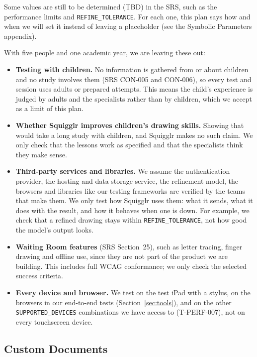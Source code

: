 \documentclass[12pt, titlepage]{article}
\begin{document}
Some values are still to be determined (TBD) in the SRS, such as the performance limits and
\texttt{REFINE\_TOLERANCE}. For each one, this plan says how and when we will
set it instead of leaving a placeholder (see the Symbolic Parameters
appendix).

With five people and one academic year, we are leaving these out:

\begin{itemize}
  \item \textbf{Testing with children.} No information is gathered from or
    about children and no study involves them (SRS CON-005 and CON-006), so every test and session uses adults or
    prepared attempts. This means the child's experience is judged by adults
    and the specialists rather than by children, which we accept as a limit
    of this plan.
  \item \textbf{Whether Squigglr improves children's drawing skills.} Showing
    that would take a long study with children, and Squigglr makes no such
    claim. We only check that the lessons work as specified and that the
    specialists think they make sense.
  \item \textbf{Third-party services and libraries.} We assume the
    authentication provider, the hosting and data storage service, the
    refinement model, the browsers and libraries like our testing frameworks
    are verified by the teams that make them. We only test how Squigglr uses
    them: what it sends, what it does with the result, and how it behaves when
    one is down. For example, we check that a refined drawing stays within
    \texttt{REFINE\_TOLERANCE}, not how good the model's output looks.
  \item \textbf{Waiting Room features} (SRS Section~25), such as letter
    tracing, finger drawing and offline use, since they are not part of the
    product we are building. This includes full WCAG conformance; we only
    check the selected success criteria.
  \item \textbf{Every device and browser.} We test on the test iPad with a
    stylus, on the browsers in our end-to-end tests (Section~\ref{sec:tools}),
    and on the other \texttt{SUPPORTED\_DEVICES} combinations we have access
    to (T-PERF-007), not on every touchscreen device.
\end{itemize}

\subsection{Custom Documents}
\end{document}
